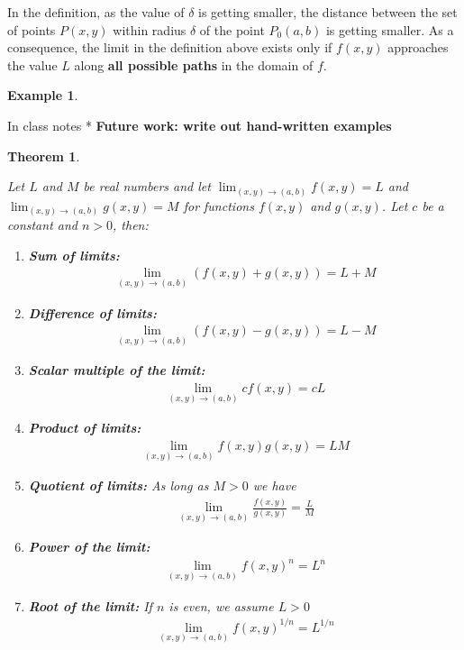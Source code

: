 \documentclass[
]{book}
\newtheorem{theorem}{Theorem}[chapter]
\theoremstyle{definition}
\theoremstyle{definition}
\newtheorem{example}{Example}[chapter]
\theoremstyle{definition}
\theoremstyle{remark}
\begin{document}
In the definition, as the value of \(\delta\) is getting smaller, the distance between the set of points \(P(x, y)\) within radius \(\delta\) of the point \(P_0(a, b)\) is getting smaller. As a consequence, the limit in the definition above exists only if \(f(x, y)\) approaches the value \(L\) along \textbf{all possible paths} in the domain of \(f\).

\begin{example}
\protect\hypertarget{exm:unlabeled-div-204}{}\label{exm:unlabeled-div-204}

In class notes
* \textbf{Future work: write out hand-written examples}

\end{example}

\begin{theorem}
\protect\hypertarget{thm:unlabeled-div-205}{}\label{thm:unlabeled-div-205}

Let \(L\) and \(M\) be real numbers and let \(\lim_{(x, y) \rightarrow (a, b)}f(x, y) = L\) and \(\lim_{(x, y) \rightarrow (a, b)}g(x, y) = M\) for functions \(f(x, y)\) and \(g(x, y)\). Let \(c\) be a constant and \(n>0\), then:

\begin{enumerate}
\def\labelenumi{\arabic{enumi})}
\item
  \textbf{Sum of limits:}
  \[
  \begin{aligned}
  \lim_{(x, y) \rightarrow (a, b)} \left( f(x, y) + g(x, y) \right) = L + M
  \end{aligned}
  \]
\item
  \textbf{Difference of limits:}
  \[
  \begin{aligned}
  \lim_{(x, y) \rightarrow (a, b)} \left( f(x, y) - g(x, y) \right) = L - M
  \end{aligned}
  \]
\item
  \textbf{Scalar multiple of the limit:}
  \[
  \begin{aligned}
  \lim_{(x, y) \rightarrow (a, b)} c f(x, y) = c L
  \end{aligned}
  \]
\item
  \textbf{Product of limits:}
  \[
  \begin{aligned}
  \lim_{(x, y) \rightarrow (a, b)} f(x, y) g(x, y) = LM
  \end{aligned}
  \]
\item
  \textbf{Quotient of limits:} As long as \(M>0\) we have
  \[
  \begin{aligned}
  \lim_{(x, y) \rightarrow (a, b)} \frac{f(x, y)}{g(x, y)} = \frac{L}{M}
  \end{aligned}
  \]
\item
  \textbf{Power of the limit:}
  \[
  \begin{aligned}
  \lim_{(x, y) \rightarrow (a, b)} f(x, y)^n = L^n
  \end{aligned}
  \]
\item
  \textbf{Root of the limit:} If \(n\) is even, we assume \(L > 0\)
  \[
  \begin{aligned}
  \lim_{(x, y) \rightarrow (a, b)} f(x, y)^{1/n} = L^{1/n}
  \end{aligned}
  \]
\end{enumerate}


\end{theorem}
\end{document}
